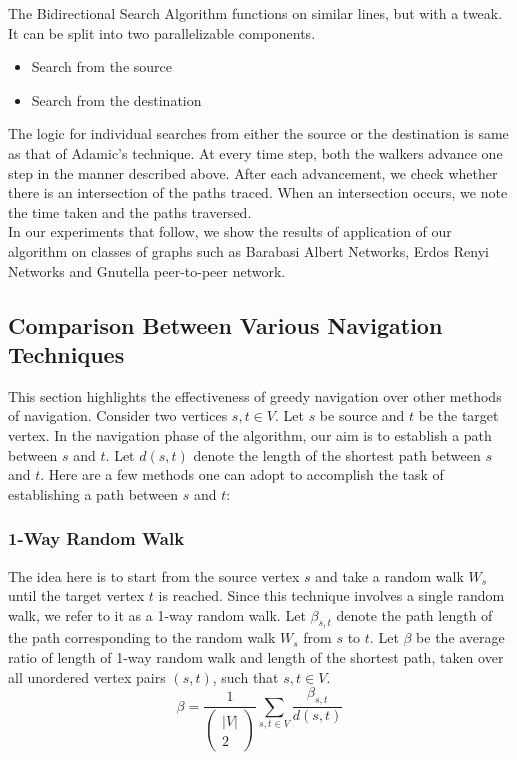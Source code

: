 \documentclass[a4paper,12pt]{article}
\begin{document}
The Bidirectional Search Algorithm functions on similar lines, but with a tweak. It can be split into two parallelizable components.

\begin{itemize}
\item Search from the source
\item Search from the destination
\end{itemize}

The logic for individual searches from either the source or the destination is same as that of Adamic's technique. At every time step, both the walkers advance one step in the manner described above. After each advancement, we check whether there is an intersection of the paths traced. When an intersection occurs, we note the time taken and the paths traversed.\\

In our experiments that follow, we show the results of application of our algorithm on classes of graphs such as Barabasi Albert Networks, Erdos Renyi Networks and Gnutella peer-to-peer network.

\subsection{Comparison Between Various Navigation Techniques}

This section highlights the effectiveness of greedy navigation over other methods of navigation. Consider two vertices $s,t \in V$. Let $s$ be source and $t$ be the target vertex. In the navigation phase of the algorithm, our aim is to establish a path between $s$ and 
$t$. Let $d(s,t)$ denote the length of the shortest path between $s$ and $t$. Here are a few methods one can adopt to accomplish the task of establishing a path between $s$ and $t$:

\subsubsection {1-Way Random Walk}
The idea here is to start from the source vertex $s$ and take a random walk 
$W_s$ until the target vertex $t$ is reached. Since this technique involves 
a single random walk, we refer to it as a 1-way random walk. Let 
$\beta_{s,t}$ denote the path length of the path corresponding to the random 
walk $W_s$ from $s$ to $t$. Let $\beta$ be the 
average ratio of length of 1-way random walk and length of the shortest 
path, taken over all unordered vertex pairs $(s,t)$, such that $s,t \in V$.
$$\beta = \frac{1}{\left(\begin{array}{c} |V|\\ 2\end{array}\right)} \sum_{s,t \in V} 
\frac{\beta_{s,t}}{d(s,t)}$$	
\end{document}
